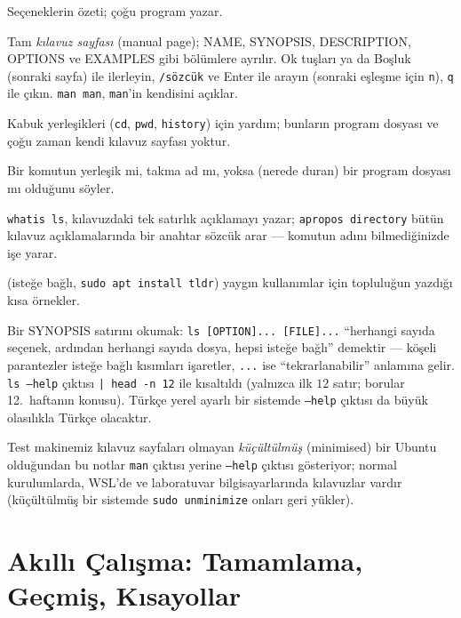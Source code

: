 \documentclass[11pt,a4paper]{article}
\newcommand{\cmd}[1]{\texttt{#1}}
\begin{document}
\begin{description}[leftmargin=0pt,itemsep=0.25em]
  \item[\cmd{komut --help}] Seçeneklerin özeti; çoğu program yazar.
  \item[\cmd{man komut}] Tam \emph{kılavuz sayfası} (manual page); NAME, SYNOPSIS, DESCRIPTION, OPTIONS ve EXAMPLES gibi bölümlere ayrılır. Ok tuşları ya da Boşluk (sonraki sayfa) ile ilerleyin, \texttt{/sözcük} ve Enter ile arayın (sonraki eşleşme için \texttt{n}), \texttt{q} ile çıkın. \cmd{man man}, \cmd{man}'in kendisini açıklar.
  \item[\cmd{help komut}] Kabuk yerleşikleri (\cmd{cd}, \cmd{pwd}, \cmd{history}) için yardım; bunların program dosyası ve çoğu zaman kendi kılavuz sayfası yoktur.
  \item[\cmd{type komut}] Bir komutun yerleşik mi, takma ad mı, yoksa (nerede duran) bir program dosyası mı olduğunu söyler.
  \item[\cmd{whatis} / \cmd{apropos}] \cmd{whatis ls}, kılavuzdaki tek satırlık açıklamayı yazar; \cmd{apropos directory} bütün kılavuz açıklamalarında bir anahtar sözcük arar --- komutun adını bilmediğinizde işe yarar.
  \item[\cmd{tldr komut}] (isteğe bağlı, \cmd{sudo apt install tldr}) yaygın kullanımlar için topluluğun yazdığı kısa örnekler.
\end{description}


Bir SYNOPSIS satırını okumak: \texttt{ls [OPTION]... [FILE]...} ``herhangi sayıda seçenek, ardından herhangi sayıda dosya, hepsi isteğe bağlı'' demektir --- köşeli parantezler isteğe bağlı kısımları işaretler, \texttt{...} ise ``tekrarlanabilir'' anlamına gelir. \cmd{ls --help} çıktısı \texttt{| head -n 12} ile kısaltıldı (yalnızca ilk $12$ satır; borular 12.\ haftanın konusu). Türkçe yerel ayarlı bir sistemde \cmd{--help} çıktısı da büyük olasılıkla Türkçe olacaktır.

Test makinemiz kılavuz sayfaları olmayan \emph{küçültülmüş} (minimised) bir Ubuntu olduğundan bu notlar \cmd{man} çıktısı yerine \cmd{--help} çıktısı gösteriyor; normal kurulumlarda, WSL'de ve laboratuvar bilgisayarlarında kılavuzlar vardır (küçültülmüş bir sistemde \cmd{sudo unminimize} onları geri yükler).

\section{Akıllı Çalışma: Tamamlama, Geçmiş, Kısayollar}
\end{document}
